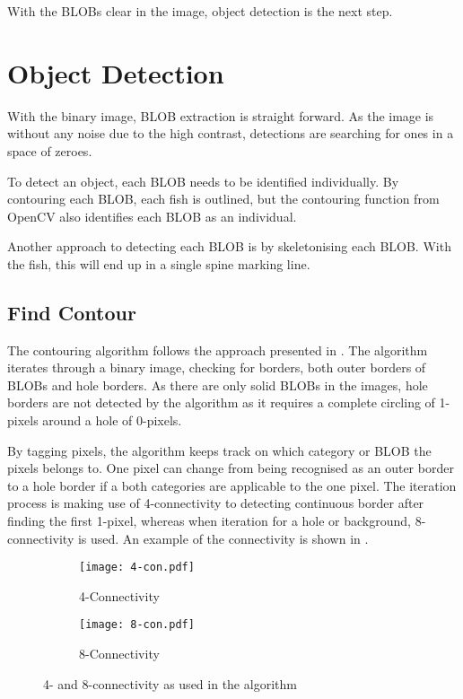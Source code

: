 With the BLOBs clear in the image, object detection is the next step.

\section{Object Detection}
With the binary image, BLOB extraction is straight forward. As the image is without any noise due to the high contrast, detections are searching for ones in a space of zeroes.

To detect an object, each BLOB needs to be identified individually. By contouring each BLOB, each fish is outlined, but the contouring function from OpenCV also identifies each BLOB as an individual.

Another approach to detecting each BLOB is by skeletonising each BLOB. With the fish, this will end up in a single spine marking line.

\subsection{Find Contour}
The contouring algorithm follows the approach presented in \cite{Suzuki1985}. The algorithm iterates through a binary image, checking for borders, both outer borders of BLOBs and hole borders. As there are only solid BLOBs in the images, hole borders are not detected by the algorithm as it requires a complete circling of 1-pixels around a hole of 0-pixels.

By tagging pixels, the algorithm keeps track on which category or BLOB the pixels belongs to. One pixel can change from being recognised as an outer border to a hole border if a both categories are applicable to the one pixel. The iteration process is making use of 4-connectivity to detecting continuous border after finding the first 1-pixel, whereas when iteration for a hole or background, 8-connectivity is used. An example of the connectivity is shown in .

\begin{figure}[H]
	\centering
	\begin{subfigure}[b]{0.4\textwidth}
		\texttt{[image: 4-con.pdf]}
		\caption{4-Connectivity}
		\label{fig:4-con}
	\end{subfigure}
	\begin{subfigure}[b]{0.4\textwidth}
		\texttt{[image: 8-con.pdf]}
		\caption{8-Connectivity}
		\label{fig:8-con}
	\end{subfigure}
	\caption{4- and 8-connectivity as used in the algorithm}
	\label{fig:connectiv}
\end{figure}

